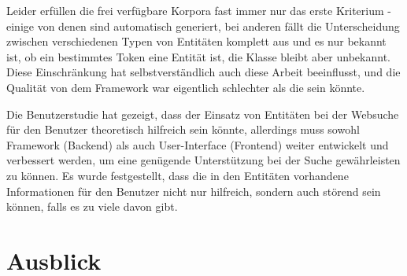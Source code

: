 Leider erfüllen die frei verfügbare Korpora fast immer nur das erste Kriterium - einige von denen sind automatisch generiert, bei anderen fällt die Unterscheidung zwischen verschiedenen Typen von Entitäten komplett aus und es nur bekannt ist, ob ein bestimmtes Token eine Entität ist, die Klasse bleibt aber unbekannt. Diese Einschränkung hat selbstverständlich auch diese Arbeit beeinflusst, und die Qualität von dem Framework war eigentlich schlechter als die sein könnte.

Die Benutzerstudie hat gezeigt, dass der Einsatz von Entitäten bei der Websuche für den Benutzer theoretisch hilfreich sein könnte, allerdings muss sowohl Framework (Backend) als auch User-Interface (Frontend) weiter entwickelt und verbessert werden, um eine genügende Unterstützung bei der Suche gewährleisten zu können. Es wurde festgestellt, dass die in den Entitäten vorhandene Informationen für den Benutzer nicht nur hilfreich, sondern auch störend sein können, falls es zu viele davon gibt.

\section{Ausblick}
